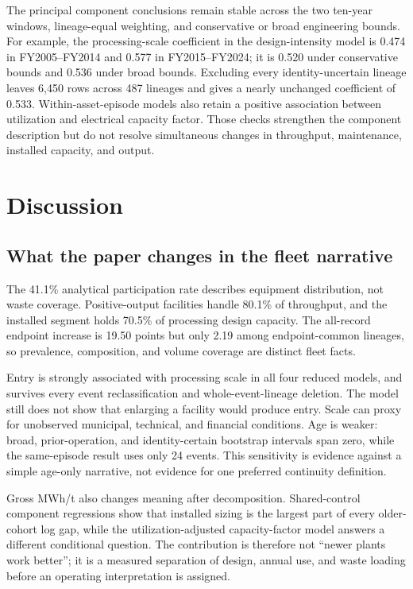 \documentclass[11pt,letterpaper]{article}
\begin{document}
The principal component conclusions remain stable across the two ten-year
windows, lineage-equal weighting, and conservative or broad engineering bounds.
For example, the processing-scale coefficient in the design-intensity model is
0.474 in FY2005--FY2014 and 0.577 in FY2015--FY2024; it is 0.520 under
conservative bounds and 0.536 under broad bounds. Excluding every
identity-uncertain lineage leaves
6,450 rows across 487 lineages and gives a nearly unchanged coefficient of
0.533. Within-asset-episode models also retain a positive association between
utilization and electrical capacity factor. Those checks strengthen the
component description but do not resolve
simultaneous changes in throughput, maintenance, installed capacity, and output.

\section{Discussion}

\subsection{What the paper changes in the fleet narrative}

The 41.1\% analytical participation rate describes equipment distribution, not
waste coverage. Positive-output facilities handle 80.1\% of throughput, and the
installed segment holds 70.5\% of processing design capacity. The all-record
endpoint increase is 19.50 points but only 2.19 among endpoint-common lineages,
so prevalence, composition, and volume coverage are distinct fleet facts.

Entry is strongly associated with processing scale in all four reduced models,
and survives every event reclassification and whole-event-lineage deletion. The
model still does not show that enlarging a facility would produce entry. Scale
can proxy for unobserved municipal, technical, and financial conditions. Age is
weaker: broad, prior-operation, and identity-certain bootstrap intervals span
zero, while the same-episode result uses only 24 events. This sensitivity is
evidence against a simple age-only narrative, not evidence for one preferred
continuity definition.

Gross MWh/t also changes meaning after decomposition. Shared-control component
regressions show that installed sizing is the largest part of every older-
cohort log gap, while the utilization-adjusted capacity-factor model answers a
different conditional question. The contribution is therefore not ``newer
plants work better''; it is a measured separation of design, annual use, and
waste loading before an operating interpretation is assigned.
\end{document}
